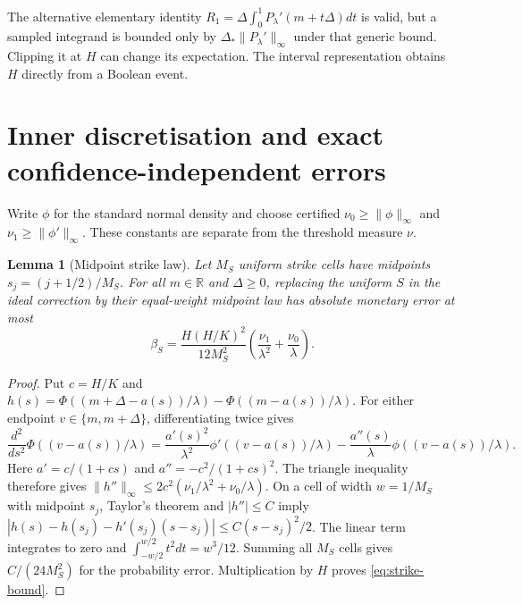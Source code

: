\documentclass[11pt]{article}
\newtheorem{lemma}[theorem]{Lemma}
\begin{document}
The alternative elementary identity
$R_1=\Delta\int_0^1P_\lambda'(m+t\Delta)dt$ is valid, but a sampled
integrand is bounded only by $\Delta_*\|P_\lambda'\|_\infty$ under
that generic bound. Clipping it at $H$ can change its expectation. The
interval representation obtains $H$ directly from a Boolean event.

\section{Inner discretisation and exact confidence-independent errors}

Write $\phi$ for the standard normal density and choose certified
$\nu_0\geq\|\phi\|_\infty$ and
$\nu_1\geq\|\phi'\|_\infty$. These constants are separate from the
threshold measure $\nu$.

\begin{lemma}[Midpoint strike law]
Let $M_S$ uniform strike cells have midpoints $s_j=(j+1/2)/M_S$.
For all $m\in\mathbb R$ and $\Delta\geq0$, replacing the uniform
$S$ in the ideal correction by their equal-weight midpoint law has
absolute monetary error at most
\[
 \beta_S=\frac{H(H/K)^2}{12M_S^2}
       \left(\frac{\nu_1}{\lambda^2}
                         +\frac{\nu_0}{\lambda}\right).
 \tag{S2}\label{eq:strike-bound}
\]
\end{lemma}
\begin{proof}
Put $c=H/K$ and
$h(s)=\Phi((m+\Delta-a(s))/\lambda)-\Phi((m-a(s))/\lambda)$.
For either endpoint $v\in\{m,m+\Delta\}$, differentiating twice gives
\[
 \frac{d^2}{ds^2}\Phi((v-a(s))/\lambda)
 =\frac{a'(s)^2}{\lambda^2}\phi'((v-a(s))/\lambda)
   -\frac{a''(s)}{\lambda}\phi((v-a(s))/\lambda).
\]
Here $a'=c/(1+cs)$ and $a''=-c^2/(1+cs)^2$. The triangle inequality
therefore gives
$\|h''\|_\infty\leq2c^2(\nu_1/\lambda^2+\nu_0/\lambda)$.
On a cell of width $w=1/M_S$ with midpoint $s_j$, Taylor's theorem
and $|h''|\leq C$ imply
$|h(s)-h(s_j)-h'(s_j)(s-s_j)|\leq C(s-s_j)^2/2$.
The linear term integrates to zero and
$\int_{-w/2}^{w/2}t^2dt=w^3/12$. Summing all $M_S$ cells gives
$C/(24M_S^2)$ for the probability error. Multiplication by $H$ proves
\eqref{eq:strike-bound}.
\end{proof}
\end{document}
